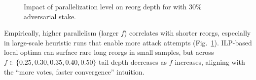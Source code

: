 \begin{figure}[htbp!]
\caption{Impact of parallelization level on reorg depth for \ProjBase{} with 30\% adversarial stake.}
\label{fig:parallelization}
\end{figure}
Empirically, higher parallelism (larger $f$) correlates with shorter reorgs, especially in large-scale heuristic runs that enable more attack attempts (Fig.~\ref{fig:parallelization}). ILP-based local optima can surface rare long reorgs in small samples, but across $f\in\{0.25,0.30,0.35,0.40,0.50\}$ tail depth decreases as $f$ increases, aligning with the “more votes, faster convergence” intuition.


